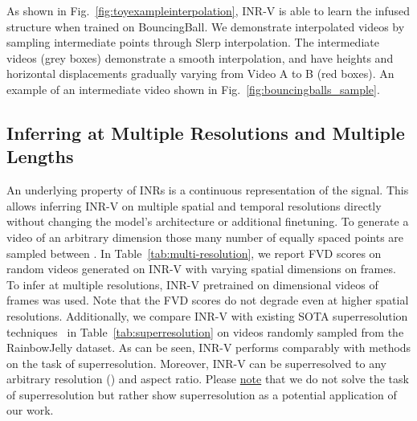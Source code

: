 \documentclass[10pt]{article} \usepackage[accepted]{tmlr}
\begin{document}
As shown in Fig.~\ref{fig:toyexampleinterpolation}, INR-V is able to learn the infused structure when trained on BouncingBall. We demonstrate interpolated videos by sampling intermediate points through Slerp interpolation. The intermediate videos (grey boxes) demonstrate a smooth interpolation, and have heights and horizontal displacements gradually varying from Video A to B (red boxes). An example of an intermediate video shown in Fig.~\ref{fig:bouncingballs_sample}. 


\subsection{Inferring at Multiple Resolutions and Multiple Lengths}
\label{sec:appendix-superresolution}



An underlying property of INRs is a continuous representation of the signal. This allows inferring INR-V on multiple spatial and temporal resolutions directly without changing the model's architecture or additional finetuning. To generate a video of an arbitrary dimension  those many number of equally spaced points are sampled between . In Table~\ref{tab:multi-resolution}, we report FVD scores on random videos generated on INR-V with varying spatial dimensions on  frames. To infer at multiple resolutions, INR-V pretrained on  dimensional videos of  frames was used. Note that the FVD scores do not degrade even at higher spatial resolutions. Additionally, we compare INR-V with existing SOTA superresolution techniques~\cite{videoinr} in Table~\ref{tab:superresolution} on  videos randomly sampled from the RainbowJelly dataset. 
As can be seen, INR-V performs comparably with methods on the task of superresolution. Moreover, INR-V can be superresolved to any arbitrary resolution () and aspect ratio. Please \underline{note} that we do not solve the task of superresolution but rather show superresolution as a potential application of our work. 
\end{document}

